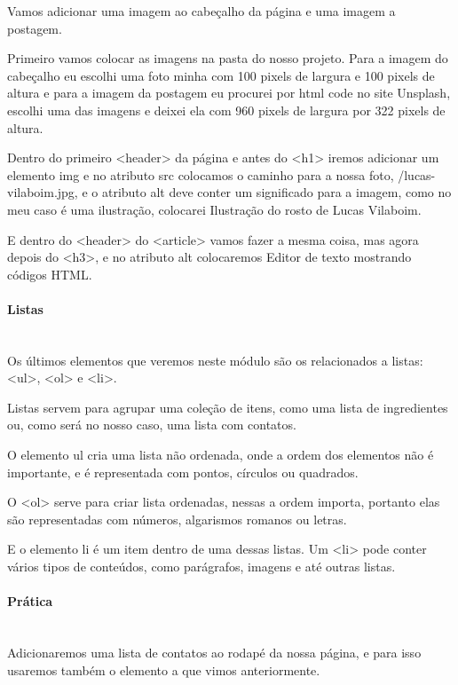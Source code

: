 \documentclass[12pt,a4paper]{article}
\begin{document}
	Vamos adicionar uma imagem ao cabeçalho da página e uma imagem a postagem.
	
	Primeiro vamos colocar as imagens na pasta do nosso projeto. Para a imagem do cabeçalho eu escolhi uma foto minha com 100 pixels de largura e 100 pixels de altura e para a imagem da postagem eu procurei por html code no site Unsplash, escolhi uma das imagens e deixei ela com 960 pixels de largura por 322 pixels de altura.
	
	Dentro do primeiro <header> da página e antes do <h1> iremos adicionar um elemento img e no atributo src colocamos o caminho para a nossa foto, /lucas-vilaboim.jpg, e o atributo alt deve conter um significado para a imagem, como no meu caso é uma ilustração, colocarei Ilustração do rosto de Lucas Vilaboim.
	
	E dentro do <header> do <article> vamos fazer a mesma coisa, mas agora depois do <h3>, e no atributo alt colocaremos Editor de texto mostrando códigos HTML.
	
	\paragraph{Listas} \mbox{} \\
	
	Os últimos elementos que veremos neste módulo são os relacionados a listas: <ul>, <ol> e <li>.
	
	Listas servem para agrupar uma coleção de itens, como uma lista de ingredientes ou, como será no nosso caso, uma lista com contatos.
	
	O elemento ul cria uma lista não ordenada, onde a ordem dos elementos não é importante, e é representada com pontos, círculos ou quadrados.
	
	O <ol> serve para criar lista ordenadas, nessas a ordem importa, portanto elas são representadas com números, algarismos romanos ou letras.
	
	E o elemento li é um item dentro de uma dessas listas. Um <li> pode conter vários tipos de conteúdos, como parágrafos, imagens e até outras listas.
	
	\paragraph{Prática} \mbox{} \\
	
	Adicionaremos uma lista de contatos ao rodapé da nossa página, e para isso usaremos também o elemento a que vimos anteriormente.
	
\end{document}
